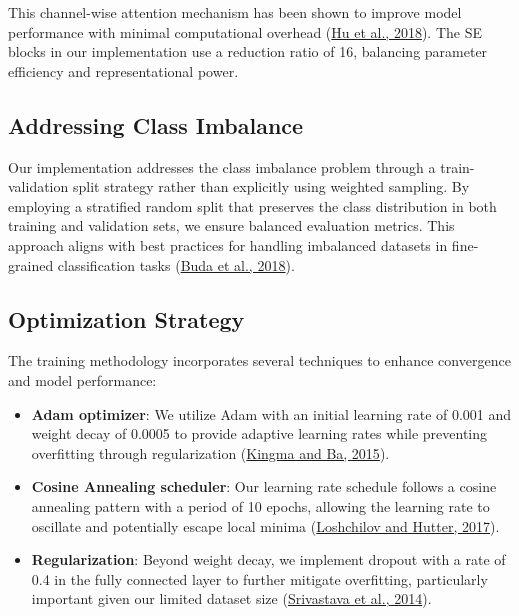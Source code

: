 \documentclass[a4paper,12pt]{article}
\begin{document}
This channel-wise attention mechanism has been shown to improve model performance with minimal computational overhead (\href{https://openaccess.thecvf.com/content_cvpr_2018/papers/Hu_Squeeze-and-Excitation_Networks_CVPR_2018_paper.pdf}{Hu et al., 2018}). The SE blocks in our implementation use a reduction ratio of 16, balancing parameter efficiency and representational power.


\subsection{Addressing Class Imbalance}

Our implementation addresses the class imbalance problem through a train-validation split strategy rather than explicitly using weighted sampling. By employing a stratified random split that preserves the class distribution in both training and validation sets, we ensure balanced evaluation metrics. This approach aligns with best practices for handling imbalanced datasets in fine-grained classification tasks (\href{https://arxiv.org/abs/1710.05381}{Buda et al., 2018}).

\subsection{Optimization Strategy}

The training methodology incorporates several techniques to enhance convergence and model performance:

\begin{itemize}
    \item \textbf{Adam optimizer}: We utilize Adam with an initial learning rate of 0.001 and weight decay of 0.0005 to provide adaptive learning rates while preventing overfitting through regularization (\href{https://arxiv.org/abs/1412.6980}{Kingma and Ba, 2015}).
    
    \item \textbf{Cosine Annealing scheduler}: Our learning rate schedule follows a cosine annealing pattern with a period of 10 epochs, allowing the learning rate to oscillate and potentially escape local minima (\href{https://arxiv.org/abs/1608.03983}{Loshchilov and Hutter, 2017}).
    
    \item \textbf{Regularization}: Beyond weight decay, we implement dropout with a rate of 0.4 in the fully connected layer to further mitigate overfitting, particularly important given our limited dataset size (\href{https://jmlr.org/papers/v15/srivastava14a.html}{Srivastava et al., 2014}).
\end{itemize}
\end{document}
